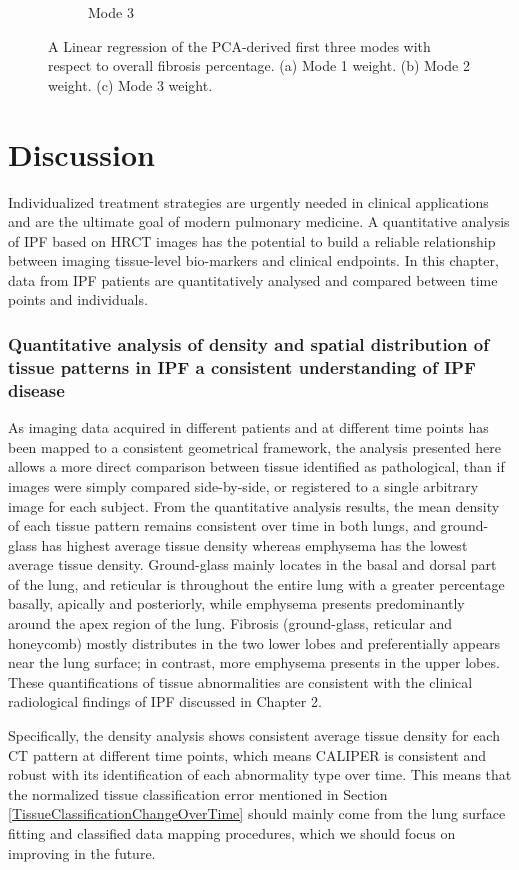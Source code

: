 \begin{figure}[H]
\begin{subfigure}{.72\linewidth}
  \caption{Mode 3}
  \label{fig:ShapeVSFibrosis-c}
\end{subfigure}
\caption{ A Linear regression of the PCA-derived first three modes with respect to overall fibrosis percentage. (a) Mode 1 weight. (b) Mode 2 weight. (c) Mode 3  weight.}
\label{fig:ShapeVSFibrosis}
\end{figure}

\section{Discussion} \label{QuantitativeDiscussion}
Individualized treatment strategies are urgently needed in clinical applications and are the ultimate goal of modern pulmonary medicine. A quantitative analysis of IPF based on HRCT images has the potential to build a reliable relationship between imaging tissue-level bio-markers and clinical endpoints. In this chapter, data from IPF patients are quantitatively analysed and compared between time points and individuals.

\subsubsection{Quantitative analysis of density and spatial distribution of tissue patterns in IPF a consistent understanding of IPF disease}
As imaging data acquired in different patients and at different time points has been mapped to a consistent geometrical framework, the analysis presented here allows a more direct comparison between tissue identified as pathological, than if images were simply compared side-by-side, or registered to a single arbitrary image for each subject. From the quantitative analysis results, the mean density of each tissue pattern remains consistent over time in both lungs, and ground-glass has highest average tissue density whereas emphysema has the lowest average tissue density. Ground-glass mainly locates in the basal and dorsal part of the lung, and reticular is throughout the entire lung with a greater percentage basally, apically and posteriorly, while emphysema presents predominantly around the apex region of the lung. Fibrosis (ground-glass, reticular and honeycomb) mostly distributes in the two lower lobes and preferentially appears near the lung surface; in contrast, more emphysema presents in the upper lobes. These quantifications of tissue abnormalities are consistent with the clinical radiological findings of IPF discussed in Chapter 2. 

Specifically, the density analysis shows consistent average tissue density for each CT pattern at different time points, which means CALIPER is consistent and robust with its identification of each abnormality type over time. This means that the normalized tissue classification error mentioned in Section \ref{TissueClassificationChangeOverTime} should mainly come from the lung surface fitting and classified data mapping procedures, which we should focus on improving in the future.

